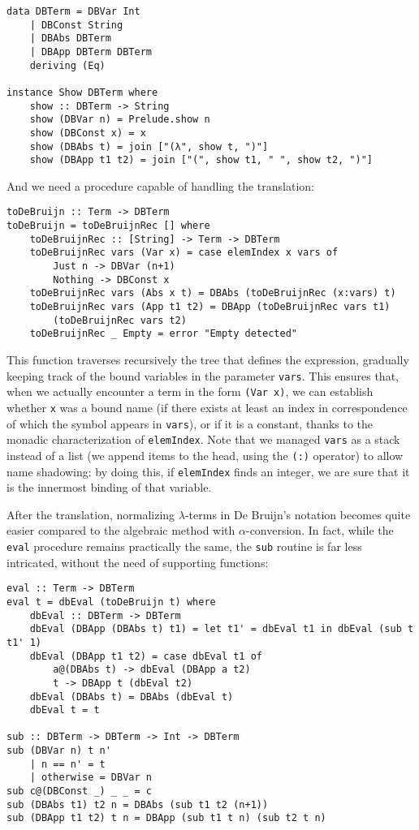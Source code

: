 \documentclass{article}
\begin{document}
\begin{lstlisting}
data DBTerm = DBVar Int
    | DBConst String
    | DBAbs DBTerm
    | DBApp DBTerm DBTerm
    deriving (Eq)

instance Show DBTerm where
    show :: DBTerm -> String
    show (DBVar n) = Prelude.show n
    show (DBConst x) = x
    show (DBAbs t) = join ["(λ", show t, ")"]
    show (DBApp t1 t2) = join ["(", show t1, " ", show t2, ")"]
\end{lstlisting}

And we need a procedure capable of handling the translation:

\begin{lstlisting}
toDeBruijn :: Term -> DBTerm
toDeBruijn = toDeBruijnRec [] where
    toDeBruijnRec :: [String] -> Term -> DBTerm
    toDeBruijnRec vars (Var x) = case elemIndex x vars of
        Just n -> DBVar (n+1)
        Nothing -> DBConst x
    toDeBruijnRec vars (Abs x t) = DBAbs (toDeBruijnRec (x:vars) t)
    toDeBruijnRec vars (App t1 t2) = DBApp (toDeBruijnRec vars t1)
        (toDeBruijnRec vars t2)
    toDeBruijnRec _ Empty = error "Empty detected"
\end{lstlisting}

This function traverses recursively the tree that defines the expression, gradually keeping track of the bound variables in the parameter \lstinline|vars|. This ensures that, when we actually encounter a term in the form \lstinline|(Var x)|, we can establish whether \lstinline|x| was a bound name (if there exists at least an index in correspondence of which the symbol appears in \lstinline|vars|), or if it is a constant, thanks to the monadic characterization of \lstinline|elemIndex|. Note that we managed \lstinline|vars| as a stack instead of a list (we append items to the head, using the \lstinline|(:)| operator) to allow name shadowing: by doing this, if \lstinline|elemIndex| finds an integer, we are sure that it is the innermost binding of that variable.

After the translation, normalizing $\lambda$-terms in De Bruijn's notation becomes quite easier compared to the algebraic method with $\alpha$-conversion. In fact, while the \lstinline|eval| procedure remains practically the same, the \lstinline|sub| routine is far less intricated, without the need of supporting functions:

\begin{lstlisting}
eval :: Term -> DBTerm
eval t = dbEval (toDeBruijn t) where
    dbEval :: DBTerm -> DBTerm
    dbEval (DBApp (DBAbs t) t1) = let t1' = dbEval t1 in dbEval (sub t t1' 1)
    dbEval (DBApp t1 t2) = case dbEval t1 of
        a@(DBAbs t) -> dbEval (DBApp a t2)
        t -> DBApp t (dbEval t2)
    dbEval (DBAbs t) = DBAbs (dbEval t)
    dbEval t = t

sub :: DBTerm -> DBTerm -> Int -> DBTerm
sub (DBVar n) t n'
    | n == n' = t
    | otherwise = DBVar n
sub c@(DBConst _) _ _ = c
sub (DBAbs t1) t2 n = DBAbs (sub t1 t2 (n+1))
sub (DBApp t1 t2) t n = DBApp (sub t1 t n) (sub t2 t n)
\end{lstlisting}
\end{document}
